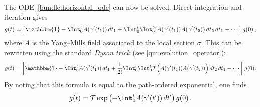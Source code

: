 \begin{example}
        The ODE~\eqref{bundle:horizontal_ode} can now be solved. Direct integration and iteration gives
        \begin{gather}
            g(t) = \left[\mathbbm{1} - \Int_0^tA(\gamma'(t_1))\,dt_1 + \Int_0^t\Int_0^{t_1}A(\gamma'(t_1))A(\gamma'(t_2))\,dt_2\,dt_1-\cdots\right]g(0)\,,
        \end{gather}
        where $A$ is the Yang--Mills field associated to the local section $\sigma$. This can be rewritten using the standard \textit{Dyson trick} (see \cref{qm:evolution_operator}):
        \begin{gather}
            g(t) = \left[\mathbbm{1} - \Int_0^tA(\gamma'(t_1))\,dt_1 + \frac{1}{2!}\Int_0^t\Int_0^t\mathcal{T}\Bigl(A(\gamma'(t_1))A(\gamma'(t_2))\Bigr)\,dt_2\,dt_1-\cdots\right]g(0).
        \end{gather}
        By noting that this formula is equal to the path-ordered exponential, one finds
        \begin{gather}
            \label{bundle:g0_to_gt}
            g(t) = \mathcal{T}\exp\left(-\Int_0^tA(\gamma'(t'))\,dt'\right)g(0)\,.
        \end{gather}
    \end{example}


